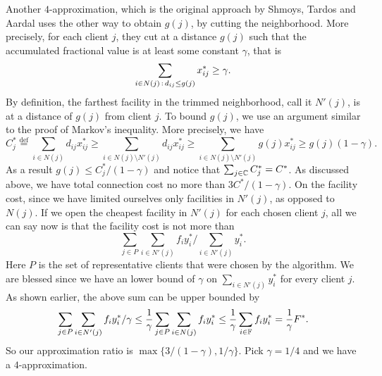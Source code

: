 \documentclass[oneside,final]{ucr}
\begin{document}
Another $4$-approximation, which is the original approach by
Shmoys, Tardos and Aardal uses the other way to obtain
$g(j)$, by cutting the neighborhood. More precisely, for
each client $j$, they cut at a distance $g(j)$ such that the
accumulated fractional value is at least some constant
$\gamma$, that is
\begin{equation*}
  \sum_{i\in N(j){\,:\,} d_{ij} \leq g(j)} x_{ij}^\ast \geq \gamma.
\end{equation*}
By definition, the farthest facility in the trimmed
neighborhood, call it $N'(j)$, is at a distance of $g(j)$
from client $j$. To bound $g(j)$, we use an argument similar
to the proof of Markov's inequality. More precisely, we have
\begin{equation*}
  C_j^\ast \stackrel{\text{def}}{=} \sum_{i\in N(j)} d_{ij} x_{ij}^\ast \geq \sum_{i\in
    N(j)\setminus N'(j)} d_{ij} x_{ij}^\ast \geq \sum_{i \in N(j)
    \setminus N'(j)} g(j) x_{ij}^\ast \geq g(j) (1 - \gamma).
\end{equation*}
As a result $g(j) \leq C_j^\ast / (1 - \gamma)$ and notice
that $\sum_{j\in \mathbb{C}} C_j^\ast = C^\ast$. As
discussed above, we have total connection cost no more than
$3C^\ast/(1-\gamma)$. On the facility cost, since we have
limited ourselves only facilities in $N'(j)$, as opposed to
$N(j)$. If we open the cheapest facility in $N'(j)$ for each
chosen client $j$, all we can say now is that the facility
cost is not more than
\begin{equation*}
  \sum_{j \in P} \sum_{i\in N'(j)} f_i y_i^\ast / \sum_{i\in N'(j)} y_i^\ast.
\end{equation*}
Here $P$ is the set of representative clients that were
chosen by the algorithm.  We are blessed since we have an
lower bound of $\gamma$ on $\sum_{i\in N'(j)} y_i^\ast$ for
every client $j$. As shown earlier, the above sum can be
upper bounded by
\begin{equation*}
  \sum_{j \in P} \sum_{i\in N'(j)} f_i y_i^\ast / \gamma \leq
  \frac{1}{\gamma} \sum_{j \in P} \sum_{i \in N(j)} f_i y_i^\ast \leq
  \frac{1}{\gamma} \sum_{i \in \mathbb{F}} f_i y_i^\ast =
  \frac{1}{\gamma} F^\ast.
\end{equation*}
So our approximation ratio is $\max\{3/(1-\gamma),
1/\gamma\}$. Pick $\gamma=1/4$ and we have a
$4$-approximation.
\end{document}
